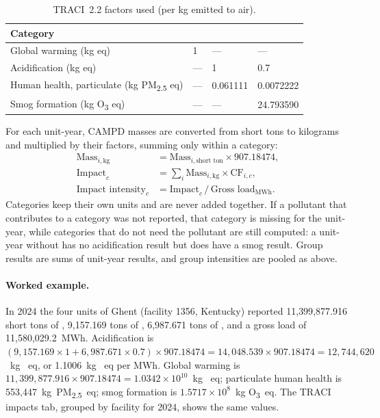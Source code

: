 \documentclass[11pt,a4paper]{article}
\newcommand{\PMtwofive}{PM\textsubscript{2.5}}
\begin{document}
\begin{table}[H]
  \centering\small
  \caption{TRACI~2.2 factors used (per kg emitted to air).}\label{tab:factors}
  \begin{tabular}{@{}llll@{}}
    \toprule
    \textbf{Category} & \textbf{\COtwo{}} & \textbf{\SOtwo{}} & \textbf{\NOx{}}\\
    \midrule
    Global warming (kg \COtwo{} eq) & 1 & --- & ---\\
    Acidification (kg \SOtwo{} eq) & --- & 1 & 0.7\\
    Human health, particulate (kg \PMtwofive{} eq) & --- & 0.061111 & 0.0072222\\
    Smog formation (kg O\textsubscript{3} eq) & --- & --- & 24.793590\\
    \bottomrule
  \end{tabular}
\end{table}

For each unit-year, CAMPD masses are converted from short tons to kilograms and multiplied by
their factors, summing only within a category:
\begin{align}
  \text{Mass}_{i,\text{kg}} &= \text{Mass}_{i,\text{short ton}} \times 907.18474,\\
  \text{Impact}_c &= \sum_i \text{Mass}_{i,\text{kg}} \times \text{CF}_{i,c},\\
  \text{Impact intensity}_c &= \text{Impact}_c \,/\, \text{Gross load}_{\text{MWh}}.
\end{align}
Categories keep their own units and are never added together. If a pollutant that contributes
to a category was not reported, that category is missing for the unit-year, while categories
that do not need the pollutant are still computed: a unit-year without \SOtwo{} has no
acidification result but does have a smog result. Group results are sums of unit-year results,
and group intensities are pooled as above.

\paragraph{Worked example.} In 2024 the four units of Ghent (facility 1356, Kentucky) reported
11{,}399{,}877.916 short tons of \COtwo{}, 9{,}157.169 tons of \SOtwo{}, 6{,}987.671 tons of
\NOx{}, and a gross load of 11{,}580{,}029.2~MWh. Acidification is $(9{,}157.169 \times 1 +
6{,}987.671 \times 0.7) \times 907.18474 = 14{,}048.539 \times 907.18474 = 12{,}744{,}620$~kg
\SOtwo{}~eq, or 1.1006~kg \SOtwo{}~eq per MWh. Global warming is $11{,}399{,}877.916 \times
907.18474 = 1.0342 \times 10^{10}$~kg \COtwo{}~eq; particulate human health is
553{,}447~kg~\PMtwofive{}~eq; smog formation is $1.5717 \times 10^{8}$~kg O\textsubscript{3}~eq.
The TRACI impacts tab, grouped by facility for 2024, shows the same values.
\end{document}
